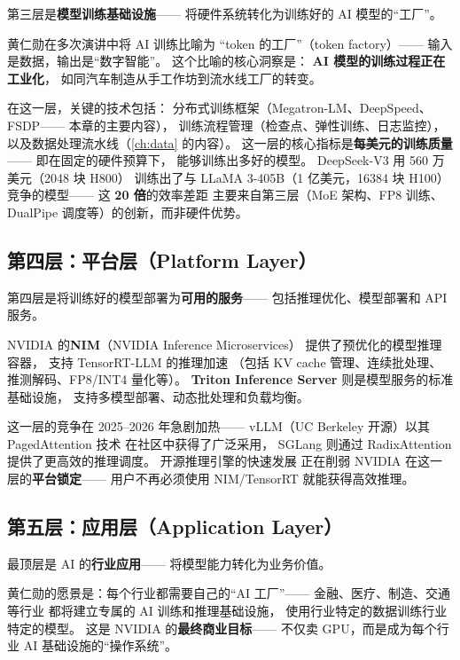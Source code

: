 第三层是\textbf{模型训练基础设施}——
将硬件系统转化为训练好的 AI 模型的``工厂''。

黄仁勋在多次演讲中将 AI 训练比喻为
``token 的工厂''（token factory）——
输入是数据，输出是``数字智能''。
这个比喻的核心洞察是：
\textbf{AI 模型的训练过程正在工业化}，
如同汽车制造从手工作坊到流水线工厂的转变。

在这一层，关键的技术包括：
分布式训练框架（Megatron-LM、DeepSpeed、FSDP——
本章的主要内容），
训练流程管理（检查点、弹性训练、日志监控），
以及数据处理流水线（\cref{ch:data} 的内容）。
这一层的核心指标是\textbf{每美元的训练质量}——
即在固定的硬件预算下，
能够训练出多好的模型。
DeepSeek-V3 用 560 万美元（2048 块 H800）
训练出了与 LLaMA 3-405B（1 亿美元，16384 块 H100）
竞争的模型——
这 \textbf{20 倍}的效率差距
主要来自第三层（MoE 架构、FP8 训练、
DualPipe 调度等）的创新，而非硬件优势。

\subsection{第四层：平台层（Platform Layer）}

第四层是将训练好的模型部署为\textbf{可用的服务}——
包括推理优化、模型部署和 API 服务。

NVIDIA 的\textbf{NIM}（NVIDIA Inference Microservices）
提供了预优化的模型推理容器，
支持 TensorRT-LLM 的推理加速
（包括 KV cache 管理、连续批处理、
推测解码、FP8/INT4 量化等）。
\textbf{Triton Inference Server}
则是模型服务的标准基础设施，
支持多模型部署、动态批处理和负载均衡。

这一层的竞争在 2025--2026 年急剧加热——
vLLM（UC Berkeley 开源）以其 PagedAttention 技术
在社区中获得了广泛采用，
SGLang 则通过 RadixAttention 提供了更高效的推理调度。
开源推理引擎的快速发展
正在削弱 NVIDIA 在这一层的\textbf{平台锁定}——
用户不再必须使用 NIM/TensorRT 就能获得高效推理。

\subsection{第五层：应用层（Application Layer）}

最顶层是 AI 的\textbf{行业应用}——
将模型能力转化为业务价值。

黄仁勋的愿景是：每个行业都需要自己的``AI 工厂''——
金融、医疗、制造、交通等行业
都将建立专属的 AI 训练和推理基础设施，
使用行业特定的数据训练行业特定的模型。
这是 NVIDIA 的\textbf{最终商业目标}——
不仅卖 GPU，而是成为每个行业
AI 基础设施的``操作系统''。

